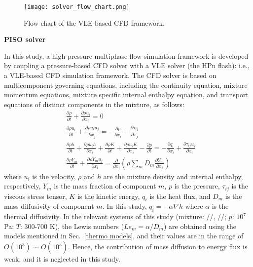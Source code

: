 \begin{figure*}[htbp]
\centering
\texttt{[image: solver\_flow\_chart.png]}
\caption{Flow chart of the VLE-based CFD framework.}
\label{FC_CFD} 
\end{figure*}

\textbf{PISO solver}

In this study, a high-pressure multiphase flow simulation framework is developed by coupling a pressure-based CFD solver with a VLE solver (the HPn flash): i.e., a VLE-based CFD simulation framework. %
The CFD solver is based on multicomponent governing equations, including the continuity equation, mixture momentum equations, mixture specific internal enthalpy equation, and transport equations of distinct components in the mixture, as follows:
\begin{align}
     & \frac{\partial \rho}{\partial t}+\frac{\partial \rho u_i}{\partial x_i}=0 \label{G:start}                                                                                                                                                                            \\
     & \frac{\partial \rho u_i}{\partial t}+\frac{\partial \rho u_i u_j}{\partial x_j}=-\frac{\partial p}{\partial x_i}+\frac{\partial \tau_{ij}}{\partial x_j} \label{Gm}                                                                                                   \\
     & \frac{\partial \rho h}{\partial t}+\frac{\partial \rho u_i h}{\partial x_i}+\frac{\partial \rho K}{\partial t}+\frac{\partial \rho u_i K}{\partial x_i}-\frac{\partial p}{\partial t}=-\frac{\partial q_i}{\partial x_i} +\frac{\partial \tau_{ij}u_j}{\partial x_i} \\
     & \frac{\partial \rho Y_m}{\partial t}+\frac{\partial \rho Y_m u_j}{\partial x_i}=\frac{\partial }{\partial x_j}\left(\rho \sum_m D_m \frac{\partial Y_m}{\partial x_j}\right) \label{G:end}
\end{align}
where $u_i$ is the velocity, $\rho$ and $h$ are the mixture density and internal enthalpy, respectively, $Y_m$ is the mass fraction of component $m$, $p$ is the pressure, $\tau_{ij}$ is the viscous stress tensor, $K$ is the kinetic energy, $q_i$ is the heat flux, and $D_m$ is the mass diffusivity of component $m$.
In this study, $q_i=-\alpha \nabla h$ where $\alpha$ is the thermal diffusivity. In the relevant systems of this study (mixture: //, //; $p$: $10^7$ Pa; $T$: 300-700 K), the Lewis numbers ($Le_m=\alpha/D_m$) are obtained using the models mentioned in Sec.~\ref{thermo models}, and their values are in the range of $O(10^3)$ $\sim$ $O(10^5)$. Hence, the contribution of mass diffusion to energy flux is weak, and it is neglected in this study.

